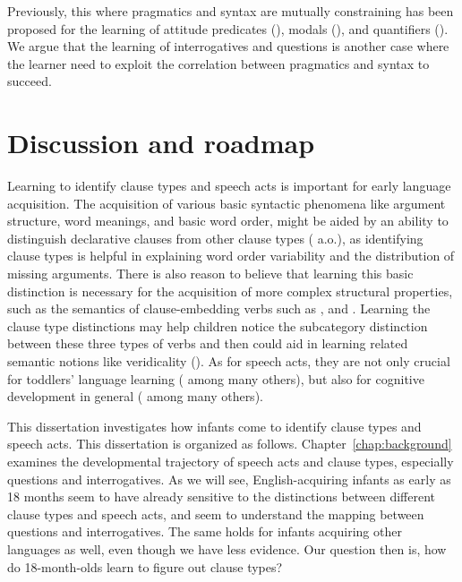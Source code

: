 Previously, this \hypos{} where pragmatics and syntax are mutually constraining has been proposed for the learning of attitude predicates (\citealt{lewis2017think, dudleyetal2018, hacquardlidz2018}), modals (\citealt{dieuleveut2021}), and quantifiers (\citealt{knowlton2021}). We argue that the learning of interrogatives and questions is another case where the learner need to exploit the correlation between pragmatics and syntax to succeed.  







\section{Discussion and roadmap}
\label{sec:intro:roadmap}

Learning to identify clause types and speech acts is important for early language acquisition. The acquisition of various basic syntactic phenomena like argument structure, word meanings, and basic word order, might be aided by an ability to distinguish declarative clauses from other clause types (\citealt{pinker1984, pinker1989, gleitman1990, frankgoldwaterfrank2013, perkins2019} a.o.), as identifying clause types is helpful in explaining word order variability and the distribution of missing arguments. There is also reason to believe that learning this basic distinction is necessary for the acquisition of more complex structural properties, such as the semantics of clause-embedding verbs such as ,  and . Learning the clause type distinctions may help children notice the subcategory distinction between these three types of verbs and then could aid in learning related semantic notions like veridicality (\citealt{white2015diss, lewis2017think,dudley2017,hacquardlidz2018}). As for speech acts, they are not only crucial for toddlers' language learning (\citealt{ninio1980, hoff1985cds,yoder1994,rowland2003cdswh, valian2003cds, rowe2017wh, gaudreau2021question} among many others), but also for cognitive development in general (\citealt{hohmann1995educating} among many others). 

This dissertation investigates how infants come to identify clause types and speech acts. This dissertation is organized as follows. Chapter~\ref{chap:background} examines the developmental trajectory of speech acts and clause types, especially questions and interrogatives. As we will see, English-acquiring infants as early as 18 months seem to have already sensitive to the distinctions between different clause types and speech acts, and seem to understand the mapping between questions and interrogatives. The same holds for infants acquiring other languages as well, even though we have less evidence. Our question then is, how do 18-month-olds learn to figure out clause types?

